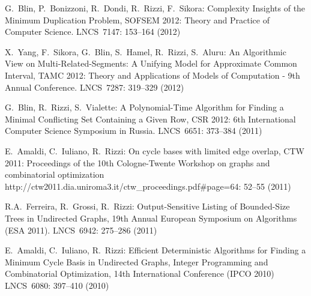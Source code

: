 \begin{etaremune}
\vspace{-1.8mm}
  \item {G.~Blin, P.~Bonizzoni, R.~Dondi, R.~Rizzi, F.~Sikora:}
   \newblock Complexity Insights of the Minimum Duplication Problem,
   \newblock SOFSEM 2012: Theory and Practice of Computer Science.
   \newblock LNCS~7147: 153--164 (2012)

\vspace{-1.8mm}
  \item {X.~Yang, F.~Sikora, G.~Blin, S.~Hamel, R.~Rizzi, S.~Aluru:}
   \newblock An Algorithmic View on Multi-Related-Segments: A Unifying Model for Approximate Common Interval,
   \newblock TAMC 2012: Theory and Applications of Models of Computation - 9th Annual Conference.
   \newblock LNCS~7287: 319--329 (2012)

\vspace{-1.8mm}
  \item {G.~Blin, R.~Rizzi, S.~Vialette:}
   \newblock A Polynomial-Time Algorithm for Finding a Minimal Conflicting Set Containing a Given Row,
   \newblock CSR 2012: 6th International Computer Science Symposium in Russia.
   \newblock LNCS~6651: 373--384 (2011)

\vspace{-1.8mm}
  \item {E.~Amaldi, C.~Iuliano, R.~Rizzi:}
   \newblock On cycle bases with limited edge overlap,
   \newblock CTW 2011: Proceedings of the 10th Cologne-Twente Workshop on graphs and combinatorial optimization
   \newblock http://ctw2011.dia.uniroma3.it/ctw\_proceedings.pdf\#page=64: 52--55 (2011)

\vspace{-1.8mm}
  \item {R.A.~Ferreira, R.~Grossi, R.~Rizzi:}
   \newblock Output-Sensitive Listing of Bounded-Size Trees in Undirected Graphs,
   \newblock 19th Annual European Symposium on Algorithms (ESA 2011).
   \newblock LNCS~6942: 275--286 (2011)

\vspace{-1.8mm}
  \item {E.~Amaldi, C.~Iuliano, R.~Rizzi:}
   \newblock Efficient Deterministic Algorithms for Finding a Minimum Cycle Basis in Undirected Graphs,
   \newblock Integer Programming and Combinatorial Optimization, 14th International Conference (IPCO 2010)
   \newblock LNCS~6080: 397--410 (2010)
%


\end{etaremune}
